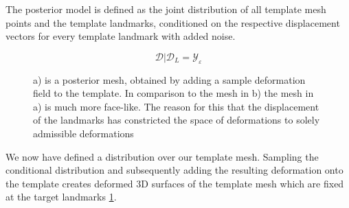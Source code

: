 The posterior model is defined as the joint distribution of all template mesh points and the
template landmarks, conditioned on the respective displacement vectors for every template landmark with added noise. 
\begin{center}
\begin{equation}
    \mathcal{D}\vert \mathcal{D}_{L} = \mathcal{Y}_{\varepsilon} 
\end{equation}
\end{center}
\begin{figure}[h!]
    \centering
    \quad\quad
    \caption{a) is a posterior mesh, obtained by adding a sample deformation field to the template. In comparison to the mesh in b) the mesh in a) is much more face-like. The reason for this that the displacement of the landmarks has constricted the space of deformations to solely admissible deformations}
\label{fig:meshposterior}
\end{figure}
We now have defined a distribution over our template mesh. Sampling the conditional distribution and subsequently adding the resulting deformation onto the template creates deformed 3D surfaces of the template mesh which are fixed at the target landmarks \ref{fig:meshposterior}.

